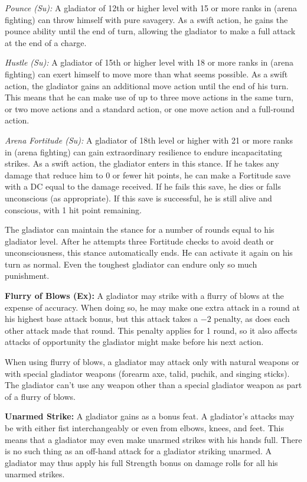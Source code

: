 \textit{Pounce (Su):} A gladiator of 12th or higher level with 15 or more ranks in  (arena fighting) can throw himself with pure savagery. As a swift action, he gains the pounce ability until the end of turn, allowing the gladiator to make a full attack at the end of a charge.

\textit{Hustle (Su):} A gladiator of 15th or higher level with 18 or more ranks in  (arena fighting) can exert himself to move more than what seems possible. As a swift action, the gladiator gains an additional move action until the end of his turn. This means that he can make use of up to three move actions in the same turn, or two move actions and a standard action, or one move action and a full-round action.

\textit{Arena Fortitude (Su):} A gladiator of 18th level or higher with 21 or more ranks in  (arena fighting) can gain extraordinary resilience to endure incapacitating strikes. As a swift action, the gladiator enters in this stance. If he takes any damage that reduce him to 0 or fewer hit points, he can make a Fortitude save with a DC equal to the damage received. If he fails this save, he dies or falls unconscious (as appropriate). If this save is successful, he is still alive and conscious, with 1 hit point remaining.

The gladiator can maintain the stance for a number of rounds equal to his gladiator level. After he attempts three Fortitude checks to avoid death or unconsciousness, this stance automatically ends. He can activate it again on his turn as normal. Even the toughest gladiator can endure only so much punishment.

\textbf{Flurry of Blows (Ex):} A gladiator may strike with a flurry of blows at the expense of accuracy. When doing so, he may make one extra attack in a round at his highest base attack bonus, but this attack takes a $-2$ penalty, as does each other attack made that round. This penalty applies for 1 round, so it also affects attacks of opportunity the gladiator might make before his next action. 

When using flurry of blows, a gladiator may attack only with natural weapons or with special gladiator weapons (forearm axe, talid, puchik, and singing sticks). The gladiator can't use any weapon other than a special gladiator weapon as part of a flurry of blows.

\textbf{Unarmed Strike:} A gladiator gains  as a bonus feat. A gladiator's attacks may be with either fist interchangeably or even from elbows, knees, and feet. This means that a gladiator may even make unarmed strikes with his hands full. There is no such thing as an off-hand attack for a gladiator striking unarmed. A gladiator may thus apply his full Strength bonus on damage rolls for all his unarmed strikes.

